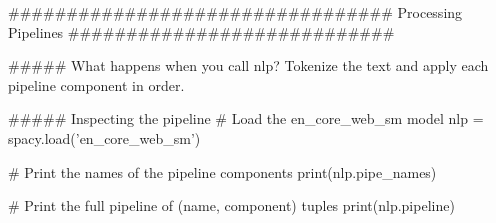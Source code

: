 #################################   Processing Pipelines    ############################


##### What happens when you call nlp?
Tokenize the text and apply each pipeline component in order.

##### Inspecting the pipeline
# Load the en_core_web_sm model
nlp = spacy.load('en_core_web_sm')

# Print the names of the pipeline components
print(nlp.pipe_names)

# Print the full pipeline of (name, component) tuples
print(nlp.pipeline)
